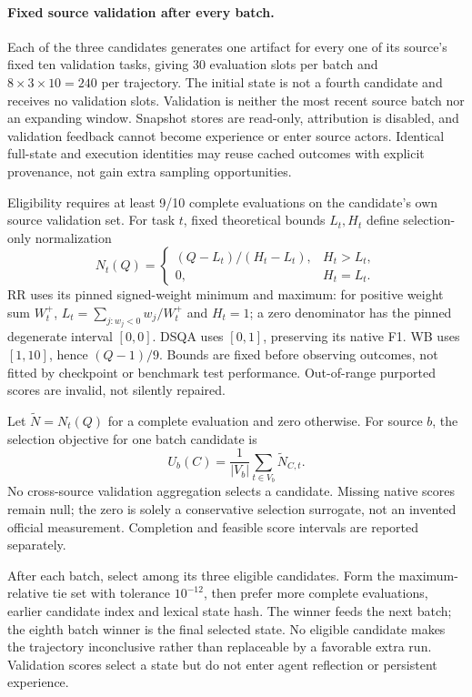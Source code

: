 \paragraph{Fixed source validation after every batch.}
Each of the three candidates generates one artifact for every one of its
source's fixed ten validation tasks, giving 30 evaluation slots per batch
and $8\times3\times10=240$ per trajectory. The initial state is not a
fourth candidate and receives no validation slots. Validation is neither the most recent source batch
nor an expanding window. Snapshot stores are read-only, attribution is
disabled, and validation feedback cannot become experience or enter source
actors. Identical full-state and execution identities may reuse cached
outcomes with explicit provenance, not gain extra sampling opportunities.

Eligibility requires at least 9/10 complete evaluations on the candidate's
own source validation set. For task $t$, fixed
theoretical bounds $L_t,H_t$ define selection-only normalization
\begin{equation}
N_t(Q)=\begin{cases}
(Q-L_t)/(H_t-L_t), & H_t>L_t,\\
0, & H_t=L_t.
\end{cases}
\end{equation}
RR uses its pinned signed-weight minimum and maximum: for positive weight
sum $W_t^+$, $L_t=\sum_{j:w_j<0}w_j/W_t^+$ and $H_t=1$; a zero denominator
has the pinned degenerate interval $[0,0]$. DSQA uses $[0,1]$, preserving
its native F1. WB uses $[1,10]$, hence $(Q-1)/9$. Bounds are fixed before
observing outcomes, not fitted by checkpoint or benchmark test performance.
Out-of-range purported scores are invalid, not silently repaired.

Let $\widetilde N= N_t(Q)$ for a complete evaluation and zero otherwise.
For source $b$, the selection objective for one batch candidate is
\begin{equation}
U_b(C)=\frac{1}{|V_b|}\sum_{t\in V_b}\widetilde N_{C,t}.
\end{equation}
No cross-source validation aggregation selects a candidate. Missing native scores remain
null; the zero is solely a conservative
selection surrogate, not an invented official measurement. Completion
and feasible score intervals are reported separately.

After each batch, select among its three eligible candidates. Form the
maximum-relative tie set with tolerance $10^{-12}$, then prefer more complete
evaluations, earlier candidate index and lexical state hash. The winner
feeds the next batch; the eighth batch winner is the final selected state.
No eligible candidate makes the trajectory inconclusive rather than
replaceable by a favorable extra run. Validation scores select a state but
do not enter agent reflection or persistent experience.


